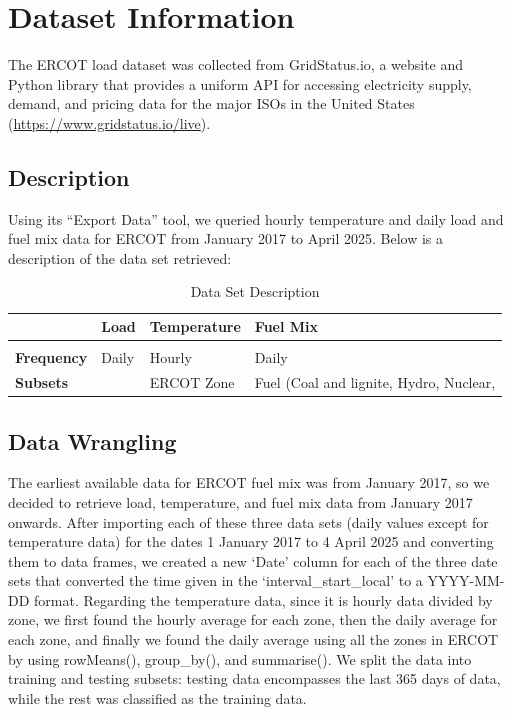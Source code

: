 \documentclass[
]{article}
\begin{document}
\section{Dataset Information}\label{dataset-information}

The ERCOT load dataset was collected from GridStatus.io, a website and
Python library that provides a uniform API for accessing electricity
supply, demand, and pricing data for the major ISOs in the United States
(\url{https://www.gridstatus.io/live}).

\subsection{Description}\label{description}

Using its ``Export Data'' tool, we queried hourly temperature and daily
load and fuel mix data for ERCOT from January 2017 to April 2025. Below
is a description of the data set retrieved:

\begin{table}[!h]
\centering\centering
\caption{\label{tab:unnamed-chunk-3}Data Set Description}
\centering
\begin{tabular}[t]{l|l|l|l}
\hline
 & Load & Temperature & Fuel Mix\\
\hline
\cellcolor{gray!10}{\textbf{Units}} & \cellcolor{gray!10}{MW} & \cellcolor{gray!10}{°F} & \cellcolor{gray!10}{MW}\\
\hline
\textbf{Frequency} & Daily & Hourly & Daily\\
\hline
\textbf{Subsets} &  & ERCOT Zone & Fuel (Coal and lignite, Hydro, Nuclear,
\cellcolor{gray!10}{                 Solar, Wind, Natural Gas)}\\
\hline
\end{tabular}
\end{table}

\newpage

\subsection{Data Wrangling}\label{data-wrangling}

The earliest available data for ERCOT fuel mix was from January 2017, so
we decided to retrieve load, temperature, and fuel mix data from January
2017 onwards. After importing each of these three data sets (daily
values except for temperature data) for the dates 1 January 2017 to 4
April 2025 and converting them to data frames, we created a new `Date'
column for each of the three date sets that converted the time given in
the `interval\_start\_local' to a YYYY-MM-DD format. Regarding the
temperature data, since it is hourly data divided by zone, we first
found the hourly average for each zone, then the daily average for each
zone, and finally we found the daily average using all the zones in
ERCOT by using rowMeans(), group\_by(), and summarise(). We split the
data into training and testing subsets: testing data encompasses the
last 365 days of data, while the rest was classified as the training
data.
\end{document}
